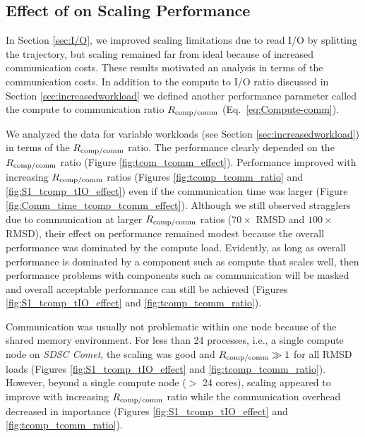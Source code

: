 
\subsection{Effect of \Rcompcomm on Scaling Performance}
\label{sec:tcomm}

In Section \ref{sec:I/O}, we improved scaling limitations due to read I/O by splitting the trajectory, but scaling remained far from ideal because of increased communication costs.
These results motivated an analysis in terms of the communication costs.
In addition to the compute to I/O ratio \RcompIO discussed in Section \ref{sec:increasedworkload} we defined another performance parameter called the compute to communication ratio $R_{\text{comp/comm}}$ (Eq.~\ref{eq:Compute-comm}).

We analyzed the data for variable workloads (see Section \ref{sec:increasedworkload}) in terms of the $R_{\text{comp/comm}}$ ratio.
The performance clearly depended on the $R_{\text{comp/comm}}$ ratio (Figure \ref{fig:tcom_tcomm_effect}).
Performance improved with increasing $R_{\text{comp/comm}}$ ratios (Figures \ref{fig:tcomp_tcomm_ratio} and \ref{fig:S1_tcomp_tIO_effect}) even if the communication time was larger (Figure \ref{fig:Comm_time_tcomp_tcomm_effect}).
Although we still observed stragglers due to communication at larger $R_{\text{comp/comm}}$ ratios ($70\times$ RMSD and $100\times$ RMSD), their effect on performance remained modest because the overall performance was dominated by the compute load. 
Evidently, as long as overall performance is dominated by a component such as compute that scales well, then performance problems with components such as communication will be masked and overall acceptable performance can still be achieved (Figures \ref{fig:S1_tcomp_tIO_effect} and \ref{fig:tcomp_tcomm_ratio}).

Communication was usually not problematic within one node because of the shared memory environment.
For less than 24 processes, i.e., a single compute node on \emph{SDSC Comet}, the scaling was good and $R_{\text{comp/comm}} \gg 1$ for all RMSD loads (Figures \ref{fig:S1_tcomp_tIO_effect} and \ref{fig:tcomp_tcomm_ratio}).
However, beyond a single compute node ($>$ 24 cores), scaling appeared to improve with increasing $R_{\text{comp/comm}}$ ratio while the communication overhead decreased in importance (Figures \ref{fig:S1_tcomp_tIO_effect} and \ref{fig:tcomp_tcomm_ratio}).

